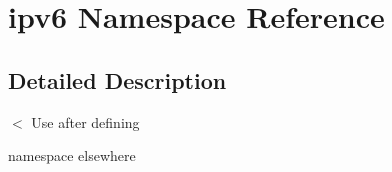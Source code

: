 \hypertarget{namespaceipv6}{}\section{ipv6 Namespace Reference}
\label{namespaceipv6}


\subsection{Detailed Description}
$<$ Use after defining

namespace elsewhere 